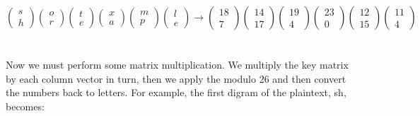 \documentclass[Lau,binding=0.6cm,oneside]{sapthesis}
\begin{document}
\begin{equation}
\begin{pmatrix}s\\h\end{pmatrix}
\begin{pmatrix}o\\r\end{pmatrix}
\begin{pmatrix}t\\e\end{pmatrix}
\begin{pmatrix}x\\a\end{pmatrix}
\begin{pmatrix}m\\p\end{pmatrix}
\begin{pmatrix}l\\e\end{pmatrix}
\rightarrow
\begin{pmatrix}18\\7\end{pmatrix}
\begin{pmatrix}14\\17\end{pmatrix}
\begin{pmatrix}19\\4\end{pmatrix}
\begin{pmatrix}23\\0\end{pmatrix}
\begin{pmatrix}12\\15\end{pmatrix}
\begin{pmatrix}11\\4\end{pmatrix}
\end{equation}
\ \\\\
Now we must perform some matrix multiplication. We multiply the key matrix by each column vector in turn, then we apply the modulo 26 and then convert the numbers back to letters. For example, the first digram of the plaintext, \textsf{sh}, becomes:\\\\
\end{document}
